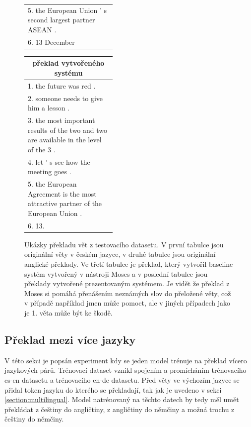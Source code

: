 \begin{figure}[H]
\begin{center}
\begin{tabular}{|p{0.42\linewidth}|}
          5. the European Union ' s second largest partner ASEAN . \\
          6. 13 December \\
          \hline
        \end{tabular}
        \hspace{10mm}
        \begin{tabular}{|p{0.42\linewidth}|}
          \hline
          \multicolumn{1}{|c|}{překlad vytvořeného systému} \\
          \hline
          1. the future was red . \\
          2. someone needs to give him a lesson . \\
          3. the most important results of the two and two are available in the level of the 3 . \\
          4. let ' s see how the meeting goes . \\
          5. the European Agreement is the most attractive partner of the European Union . \\
          6. 13. \\
          \hline
        \end{tabular}
    \end{center}
	\caption{Ukázky překladu vět z testovacího datasetu. V první tabulce jsou originální věty v českém jazyce, v druhé tabulce jsou originální anglické překlady. Ve třetí tabulce je překlad, který vytvořil baseline systém vytvořený v nástroji Moses a v poslední tabulce jsou překlady vytvořené prezentovaným systémem. Je vidět že překlad z Moses si pomáhá přenášením neznámých slov do přeložené věty, což v případě například jmen může pomoct, ale v jiných případech jako je 1. věta může být ke škodě.}
	\label{img:exampleResults}
\end{figure}


\subsection{Překlad mezi více jazyky} \label{experimentMultiLingual}
V této sekci je popsán experiment kdy se jeden model trénuje na překlad vícero jazykových párů. Trénovací dataset vznikl spojením a promícháním trénovacího cs-en datasetu a trénovacího en-de datasetu. Před věty ve výchozím jazyce se přidal token jazyku do kterého se překladají, tak jak je uvedeno v sekci \ref{section:multilingual}. Model natrénovaný na těchto datech by tedy měl umět překládat z češtiny do angličtiny, z angličtiny do němčiny a možná trochu z češtiny do němčiny.

